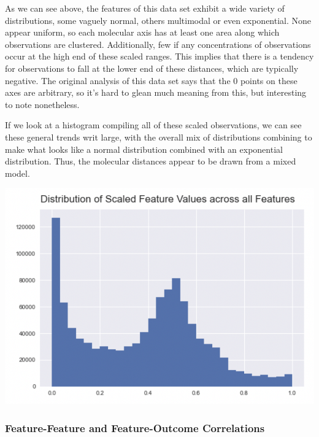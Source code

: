 \documentclass[12pt]{article}
\begin{document}
As we can see above, the features of this data set exhibit a wide variety of distributions, some vaguely normal, others multimodal or even exponential. None appear uniform, so each molecular axis has at least one area along which observations are clustered. Additionally, few if any concentrations of observations occur at the high end of these scaled ranges. This implies that there is a tendency for observations to fall at the lower end of these distances, which are typically negative. The original analysis of this data set says that the 0 points on these axes are arbitrary, so it's hard to glean much meaning from this, but interesting to note nonetheless.

If we look at a histogram compiling all of these scaled observations, we can see these general trends writ large, with the overall mix of distributions combining to make what looks like a normal distribution combined with an exponential distribution. Thus, the molecular distances appear to be drawn from a mixed model.

\begin{center}
\includegraphics[scale=.35]{all_feature_distrib.jpg}
\end{center}

\subsubsection{Feature-Feature and Feature-Outcome Correlations}
\end{document}
